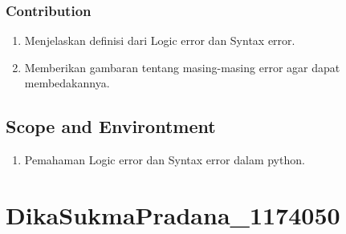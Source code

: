 \subsubsection{Contribution}
\begin{enumerate}
	\item Menjelaskan definisi dari Logic error dan Syntax error.
	\item Memberikan gambaran tentang masing-masing error agar dapat membedakannya.
\end{enumerate}
		
\subsection{Scope and Environtment}
\begin{enumerate}
	\item Pemahaman Logic error dan Syntax error dalam python.
\end{enumerate}

\section{DikaSukmaPradana\_1174050}
